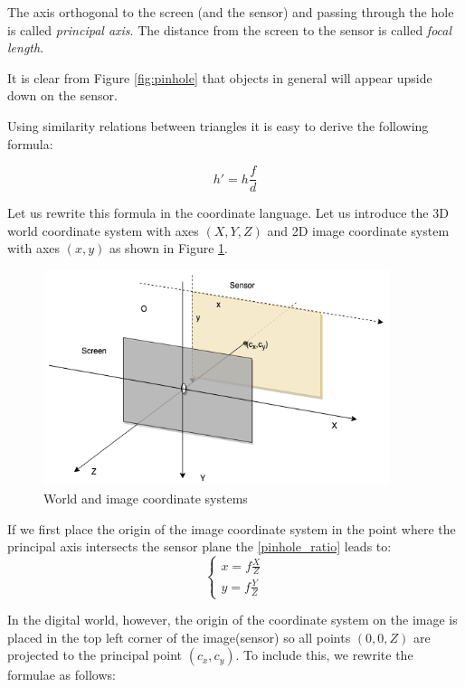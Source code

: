 \documentclass[a4paper,10pt]{article}
\begin{document}
The axis orthogonal to the screen (and the sensor) and passing through the hole is called {\it principal axis}. The distance from the screen to the sensor is called {\it focal length}. 

It is clear from Figure \ref{fig:pinhole} that objects in general will appear upside down on the sensor. 

Using similarity relations between triangles it is easy to derive the following formula:

\begin{equation}                                                                                                                                                                         
h' = h\frac{f}{d}
\label{pinhole_ratio}
\end{equation}

Let us rewrite this formula in the coordinate language. Let us introduce  the 3D world coordinate system  with axes $(X,Y,Z)$ and 2D image coordinate system with axes $(x,y)$ as shown in Figure \ref{fig:pinhole_coordinates}.

\begin{figure}[h]
\centering
 \includegraphics[width=0.9\textwidth]{../../images/pinhole_coords.png}
 \caption{World and image coordinate systems}
 \label{fig:pinhole_coordinates}
\end{figure}

If we first place the origin of the image coordinate system in the point where the principal axis intersects the sensor plane the \eqref{pinhole_ratio} leads to:
$$
\left\{\begin{array}{c}
x = f \frac{X}{Z} \\
y = f \frac{Y}{Z} 
\end{array}\right.
$$

In the digital world, however, the origin of the coordinate system on the image is placed in the top left corner of the image(sensor) so all points $(0,0,Z)$ are projected to the principal point $(c_x, c_y)$.  To include this, we rewrite the formulae as follows:  
\end{document}
